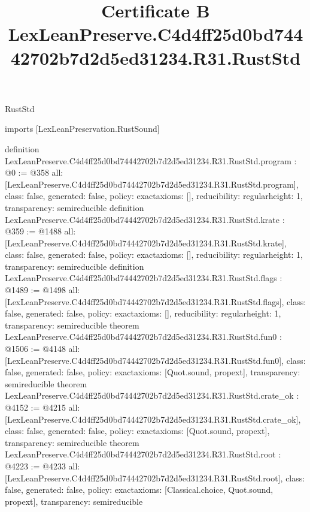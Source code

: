 \begin{lexlean}{RustStd}
\title{Certificate B LexLeanPreserve.C4d4ff25d0bd74442702b7d2d5ed31234.R31.RustStd}
\begin{coremodule}
imports [LexLeanPreservation.RustSound]

definition LexLeanPreserve.C4d4ff25d0bd74442702b7d2d5ed31234.R31.RustStd.program : @0 := @358 {
  all: [LexLeanPreserve.C4d4ff25d0bd74442702b7d2d5ed31234.R31.RustStd.program],
  class: false,
  generated: false,
  policy: exact{axioms: []},
  reducibility: regular{height: 1},
  transparency: semireducible
}
definition LexLeanPreserve.C4d4ff25d0bd74442702b7d2d5ed31234.R31.RustStd.krate : @359 := @1488 {
  all: [LexLeanPreserve.C4d4ff25d0bd74442702b7d2d5ed31234.R31.RustStd.krate],
  class: false,
  generated: false,
  policy: exact{axioms: []},
  reducibility: regular{height: 1},
  transparency: semireducible
}
definition LexLeanPreserve.C4d4ff25d0bd74442702b7d2d5ed31234.R31.RustStd.flags : @1489 := @1498 {
  all: [LexLeanPreserve.C4d4ff25d0bd74442702b7d2d5ed31234.R31.RustStd.flags],
  class: false,
  generated: false,
  policy: exact{axioms: []},
  reducibility: regular{height: 1},
  transparency: semireducible
}
theorem LexLeanPreserve.C4d4ff25d0bd74442702b7d2d5ed31234.R31.RustStd.fun0 : @1506 := @4148 {
  all: [LexLeanPreserve.C4d4ff25d0bd74442702b7d2d5ed31234.R31.RustStd.fun0],
  class: false,
  generated: false,
  policy: exact{axioms: [Quot.sound, propext]},
  transparency: semireducible
}
theorem LexLeanPreserve.C4d4ff25d0bd74442702b7d2d5ed31234.R31.RustStd.crate_ok : @4152 := @4215 {
  all: [LexLeanPreserve.C4d4ff25d0bd74442702b7d2d5ed31234.R31.RustStd.crate_ok],
  class: false,
  generated: false,
  policy: exact{axioms: [Quot.sound, propext]},
  transparency: semireducible
}
theorem LexLeanPreserve.C4d4ff25d0bd74442702b7d2d5ed31234.R31.RustStd.root : @4223 := @4233 {
  all: [LexLeanPreserve.C4d4ff25d0bd74442702b7d2d5ed31234.R31.RustStd.root],
  class: false,
  generated: false,
  policy: exact{axioms: [Classical.choice, Quot.sound, propext]},
  transparency: semireducible
}


\end{coremodule}
\end{lexlean}
